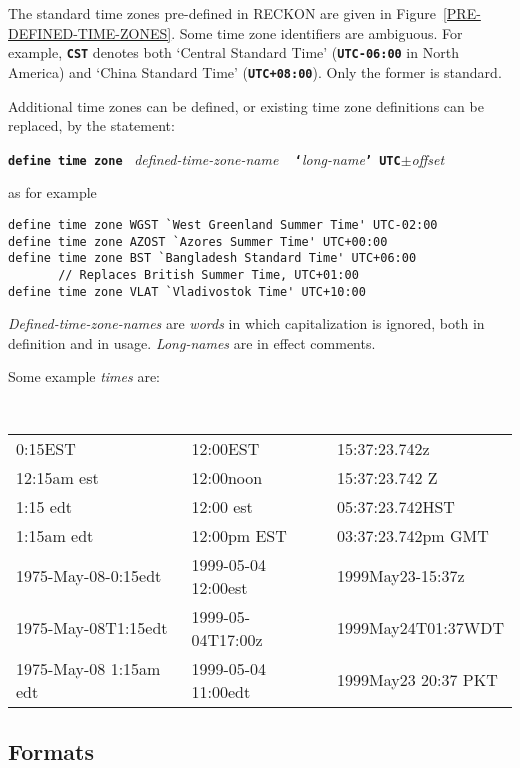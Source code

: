 \documentclass[12pt]{article}
\newcommand{\TT}[1]{{\tt \bfseries #1}}
\newenvironment{indpar}[1][0.3in]%
	{\begin{list}{}%
		     {\setlength{\itemsep}{0in}%
		      \setlength{\topsep}{0in}%
		      \setlength{\parsep}{1ex}%
		      \setlength{\labelwidth}{#1}%
		      \setlength{\leftmargin}{#1}%
		      \addtolength{\leftmargin}{\labelsep}}%
	 \item}%
	{\end{list}}
\begin{document}
The standard time zones pre-defined in RECKON are given in
Figure~\ref{PRE-DEFINED-TIME-ZONES}.
Some time zone identifiers are ambiguous.  For example, \TT{CST}
denotes both `Central Standard Time' (\TT{UTC-06:00} in North America)
and `China Standard Time' (\TT{UTC+08:00}).  Only the former is standard.

Additional time zones can be defined, or existing time zone
definitions can be replaced, by the statement:
\begin{center}
\TT{define time zone} ~{\em defined-time-zone-name} ~
    \TT{`}{\em long-name}\TT{' UTC}$\pm${\em offset}
\end{center}

as for example
\begin{indpar}\begin{verbatim}
define time zone WGST `West Greenland Summer Time' UTC-02:00
define time zone AZOST `Azores Summer Time' UTC+00:00
define time zone BST `Bangladesh Standard Time' UTC+06:00
       // Replaces British Summer Time, UTC+01:00
define time zone VLAT `Vladivostok Time' UTC+10:00
\end{verbatim}\end{indpar}

{\em Defined-time-zone-names} are {\em words} in which
capitalization is ignored, both in definition and in usage.
{\em Long-names} are in effect comments.

Some example {\em times} are:

\begin{indpar}[0.1in]
\tt
\begin{tabular}{@{}l@{~}l@{~}l@{}}
0:15EST			& 12:00EST		& 15:37:23.742z \\
12:15am est		& 12:00noon		& 15:37:23.742 Z \\
1:15 edt		& 12:00 est		& 05:37:23.742HST \\
1:15am edt		& 12:00pm EST		& 03:37:23.742pm GMT \\
1975-May-08-0:15edt	& 1999-05-04 12:00est	& 1999May23-15:37z \\
1975-May-08T1:15edt	& 1999-05-04T17:00z	& 1999May24T01:37WDT \\
1975-May-08 1:15am edt	& 1999-05-04 11:00edt	& 1999May23 20:37 PKT \\
\end{tabular}
\end{indpar}

\subsection{Formats}
\label{FORMATS}
\end{document}
